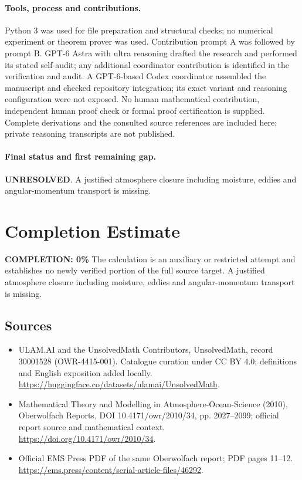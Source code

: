 \documentclass[11pt]{article}
\begin{document}
\paragraph{Tools, process and contributions.}
Python 3 was used for file preparation and structural checks; no numerical experiment or theorem prover was used. Contribution prompt A was followed by prompt B. GPT-6 Astra with ultra reasoning drafted the research and performed its stated self-audit; any additional coordinator contribution is identified in the verification and audit. A GPT-6-based Codex coordinator assembled the manuscript and checked repository integration; its exact variant and reasoning configuration were not exposed. No human mathematical contribution, independent human proof check or formal proof certification is supplied. Complete derivations and the consulted source references are included here; private reasoning transcripts are not published.

\paragraph{Final status and first remaining gap.}
\textbf{UNRESOLVED}. A justified atmosphere closure including moisture, eddies and angular-momentum transport is missing.

\section{Completion Estimate}
\noindent\textbf{COMPLETION: 0\%}
The calculation is an auxiliary or restricted attempt and establishes no newly verified portion of the full source target. A justified atmosphere closure including moisture, eddies and angular-momentum transport is missing.

\subsection{Sources}
\begin{itemize}
\item[\hypertarget{source:30001528:1}{S1}] ULAM.AI and the UnsolvedMath Contributors, UnsolvedMath, record 30001528 (OWR-4415-001). Catalogue curation under CC BY 4.0; definitions and English exposition added locally.
\url{https://huggingface.co/datasets/ulamai/UnsolvedMath}.
\item[\hypertarget{source:30001528:2}{S2}] Mathematical Theory and Modelling in Atmosphere-Ocean-Science (2010), Oberwolfach Reports, DOI 10.4171/owr/2010/34, pp. 2027--2099; official report source and mathematical context.
\url{https://doi.org/10.4171/owr/2010/34}.
\item[\hypertarget{source:30001528:3}{S3}] Official EMS Press PDF of the same Oberwolfach report; PDF pages 11--12.
\url{https://ems.press/content/serial-article-files/46292}.
\end{itemize}
\label{end:30001528}
\end{document}
